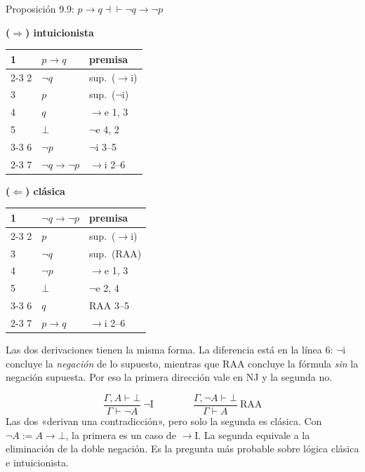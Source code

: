 \documentclass[11pt,a4paper]{article}
\begin{document}
\begin{ejemplotesis}{Proposición 9.9: \(p\to q\dashv\vdash\neg q\to\neg p\)}
\begin{minipage}[t]{0.49\textwidth}
\textbf{(\(\Rightarrow\)) intuicionista}\\[2pt]
\begin{tabular}{lll}
1 & \(p\to q\) & premisa\\ \cline{2-3}
2 & \multicolumn{1}{|l}{\(\neg q\)} & sup.\ (\(\to\)i)\\
3 & \multicolumn{1}{|l}{\quad\(p\)} & sup.\ (\(\neg\)i)\\
4 & \multicolumn{1}{|l}{\quad\(q\)} & \(\to\)e 1, 3\\
5 & \multicolumn{1}{|l}{\quad\(\bot\)} & \(\neg\)e 4, 2\\ \cline{3-3}
6 & \multicolumn{1}{|l}{\(\neg p\)} & \(\neg\)i 3--5\\ \cline{2-3}
7 & \(\neg q\to\neg p\) & \(\to\)i 2--6
\end{tabular}
\end{minipage}\hfill
\begin{minipage}[t]{0.49\textwidth}
\textbf{(\(\Leftarrow\)) clásica}\\[2pt]
\begin{tabular}{lll}
1 & \(\neg q\to\neg p\) & premisa\\ \cline{2-3}
2 & \multicolumn{1}{|l}{\(p\)} & sup.\ (\(\to\)i)\\
3 & \multicolumn{1}{|l}{\quad\(\neg q\)} & sup.\ (RAA)\\
4 & \multicolumn{1}{|l}{\quad\(\neg p\)} & \(\to\)e 1, 3\\
5 & \multicolumn{1}{|l}{\quad\(\bot\)} & \(\neg\)e 2, 4\\ \cline{3-3}
6 & \multicolumn{1}{|l}{\(q\)} & RAA 3--5\\ \cline{2-3}
7 & \(p\to q\) & \(\to\)i 2--6
\end{tabular}
\end{minipage}

\medskip
Las dos derivaciones tienen la misma forma. La diferencia está en la línea 6:
\(\neg\)i concluye la \emph{negación} de lo supuesto, mientras que RAA
concluye la fórmula \emph{sin} la negación supuesta. Por eso la primera
dirección vale en NJ y la segunda no.
\end{ejemplotesis}

\begin{nota}
\[
\frac{\Gamma,A\vdash\bot}{\Gamma\vdash\neg A}\ \neg\mathrm I
\qquad\qquad
\frac{\Gamma,\neg A\vdash\bot}{\Gamma\vdash A}\ \mathrm{RAA}
\]
Las dos «derivan una contradicción», pero solo la segunda es clásica. Con
\(\neg A:=A\to\bot\), la primera es un caso de \(\to\)I. La segunda equivale a
la eliminación de la doble negación. Es la pregunta más probable sobre lógica
clásica e intuicionista.
\end{nota}
\end{document}
